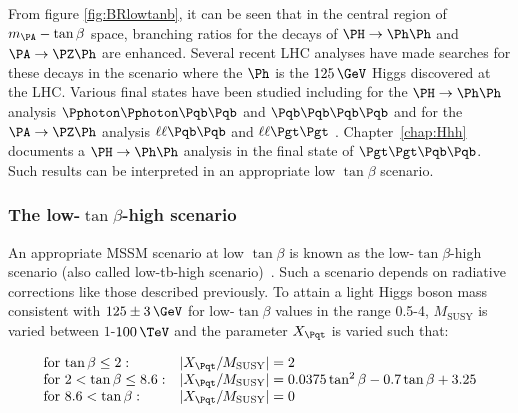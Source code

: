 From figure \ref{fig:BRlowtanb}, it can be seen that in the central region of 
$m_{\PA}-\tan\beta$ space, branching ratios for the decays of
$\PH\to\Ph\Ph$ and $\PA\to\PZ\Ph$ are enhanced. Several recent LHC analyses have
made searches for these decays in the scenario where the $\Ph$ is the $125\,\GeV$
Higgs discovered at the LHC. Various final states have been studied including
for the $\PH\to\Ph\Ph$ analysis $\Pphoton\Pphoton\Pqb\Pqb$ \cite{Aad:2014yja,CMS-PAS-HIG-13-032} and 
$\Pqb\Pqb\Pqb\Pqb$ \cite{CMS-PAS-HIG-14-013} and for the $\PA\to\PZ\Ph$ analysis $\ell\ell\Pqb\Pqb$
and $\ell\ell\Pgt\Pgt$ \cite{Aad:2015wra,Khachatryan:2015lba}. 
Chapter~\ref{chap:Hhh} documents a $\PH\to\Ph\Ph$ analysis in the
final state of $\Pgt\Pgt\Pqb\Pqb$. Such results can be interpreted in an
appropriate low $\tan\beta$ scenario.

\subsubsection{The low-$\tan\beta$-high scenario}
\label{sec:lowtanbscenario}

An appropriate \ac{MSSM} scenario at low $\tan\beta$ is known as the
low-$\tan\beta$-high scenario (also called low-tb-high scenario)~\cite{lowtanbhighwiki}. 
Such a scenario depends on radiative
corrections like those described previously. To attain a light Higgs boson mass
consistent with $125\pm3\,\GeV$ for low-$\tan\beta$ values in the range 0.5-4,
$M_{\text{SUSY}}$ is varied between $1$-$100\,\TeV$ and the parameter $X_{\Pqt}$ is
varied such that:




\begin{align*}
    \begin{array}{ll}
        \text{for $\tan\beta\leq2$}: & |X_{\Pqt}/M_{\text{SUSY}}| = 2 \\
        \text{for $2<\tan\beta\leq8.6$}:  & |X_{\Pqt}/M_{\text{SUSY}}| = 0.0375\tan^{2}\beta - 0.7\tan\beta + 3.25  \\
        \text{for $8.6<\tan\beta$}: & |X_{\Pqt}/M_{\text{SUSY}}| = 0 \\ 
    \end{array}
\end{align*}

